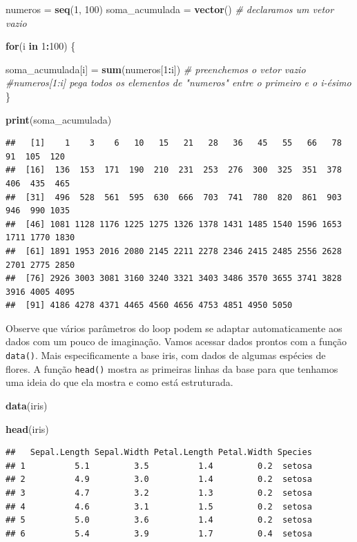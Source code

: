 \documentclass[
]{article}
\newenvironment{Shaded}{\begin{snugshade}}{\end{snugshade}}
\newcommand{\CommentTok}[1]{\textcolor[rgb]{0.56,0.35,0.01}{\textit{#1}}}
\newcommand{\ControlFlowTok}[1]{\textcolor[rgb]{0.13,0.29,0.53}{\textbf{#1}}}
\newcommand{\DecValTok}[1]{\textcolor[rgb]{0.00,0.00,0.81}{#1}}
\newcommand{\KeywordTok}[1]{\textcolor[rgb]{0.13,0.29,0.53}{\textbf{#1}}}
\newcommand{\NormalTok}[1]{#1}
\newcommand{\OperatorTok}[1]{\textcolor[rgb]{0.81,0.36,0.00}{\textbf{#1}}}
\newcommand{\StringTok}[1]{\textcolor[rgb]{0.31,0.60,0.02}{#1}}
\begin{document}
\begin{Shaded}
\begin{Highlighting}[]
\NormalTok{numeros =}\StringTok{ }\KeywordTok{seq}\NormalTok{(}\DecValTok{1}\NormalTok{, }\DecValTok{100}\NormalTok{)}
\NormalTok{soma_acumulada =}\StringTok{ }\KeywordTok{vector}\NormalTok{() }\CommentTok{# declaramos um vetor vazio}

\ControlFlowTok{for}\NormalTok{(i }\ControlFlowTok{in} \DecValTok{1}\OperatorTok{:}\DecValTok{100}\NormalTok{) \{}
  
\NormalTok{  soma_acumulada[i] =}\StringTok{ }\KeywordTok{sum}\NormalTok{(numeros[}\DecValTok{1}\OperatorTok{:}\NormalTok{i]) }\CommentTok{# preenchemos o vetor vazio}
  \CommentTok{#numeros[1:i] pega todos os elementos de "numeros" entre o primeiro e o i-ésimo}
\NormalTok{\}}

\KeywordTok{print}\NormalTok{(soma_acumulada)}
\end{Highlighting}
\end{Shaded}

\begin{verbatim}
##   [1]    1    3    6   10   15   21   28   36   45   55   66   78   91  105  120
##  [16]  136  153  171  190  210  231  253  276  300  325  351  378  406  435  465
##  [31]  496  528  561  595  630  666  703  741  780  820  861  903  946  990 1035
##  [46] 1081 1128 1176 1225 1275 1326 1378 1431 1485 1540 1596 1653 1711 1770 1830
##  [61] 1891 1953 2016 2080 2145 2211 2278 2346 2415 2485 2556 2628 2701 2775 2850
##  [76] 2926 3003 3081 3160 3240 3321 3403 3486 3570 3655 3741 3828 3916 4005 4095
##  [91] 4186 4278 4371 4465 4560 4656 4753 4851 4950 5050
\end{verbatim}

Observe que vários parâmetros do loop podem se adaptar automaticamente
aos dados com um pouco de imaginação. Vamos acessar dados prontos com a
função \texttt{data()}. Mais especificamente a base iris, com dados de
algumas espécies de flores. A função \texttt{head()} mostra as primeiras
linhas da base para que tenhamos uma ideia do que ela mostra e como está
estruturada.

\begin{Shaded}
\begin{Highlighting}[]
\KeywordTok{data}\NormalTok{(iris)}

\KeywordTok{head}\NormalTok{(iris)}
\end{Highlighting}
\end{Shaded}

\begin{verbatim}
##   Sepal.Length Sepal.Width Petal.Length Petal.Width Species
## 1          5.1         3.5          1.4         0.2  setosa
## 2          4.9         3.0          1.4         0.2  setosa
## 3          4.7         3.2          1.3         0.2  setosa
## 4          4.6         3.1          1.5         0.2  setosa
## 5          5.0         3.6          1.4         0.2  setosa
## 6          5.4         3.9          1.7         0.4  setosa
\end{verbatim}
\end{document}
